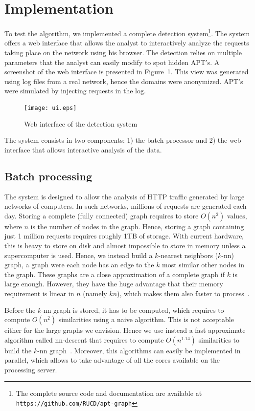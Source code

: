 \documentclass[conference]{IEEEtran}
\begin{document}
\section{Implementation}
\label{sec:implementation}

To test the algorithm, we implemented a complete detection system\footnote{The complete source code and documentation are available at \texttt{https://github.com/RUCD/apt-graph}}. The system offers a web interface that allows the analyst to interactively analyze the requests taking place on the network using his browser. The detection relies on multiple parameters that the analyst can easily modify to spot hidden APT's. A screenshot of the web interface is presented in Figure~\ref{fig:ui}. This view was generated using log files from a real network, hence the domains were anonymized. APT's were simulated by injecting requests in the log.

\begin{figure}
  \centering
  \texttt{[image: ui.eps]}
  \caption{Web interface of the detection system}
  \label{fig:ui}
\end{figure}

The system consists in two components: 1) the batch processor and 2) the web interface that allows interactive analysis of the data.

\subsection{Batch processing}

The system is designed to allow the analysis of HTTP traffic generated by large networks of computers. In such networks, millions of requests are generated each day. Storing a complete (fully connected) graph requires to store $O(n^2)$ values, where $n$ is the number of nodes in the graph. Hence, storing a graph containing just 1 million requests requires roughly 1TB of storage. With current hardware, this is heavy to store on disk and almost impossible to store in memory unless a supercomputer is used. Hence, we instead build a $k$-nearest neighbors ($k$-nn) graph, a graph were each node has an edge to the $k$ most similar other nodes in the graph. These graphs are a close approximation of a complete graph if $k$ is large enough. However, they have the huge advantage that their memory requirement is linear in $n$ (namely $kn$), which makes them also faster to process~\cite{LulliDDMR15}.

Before the $k$-nn graph is stored, it has to be computed, which requires to compute $O(n^2)$ similarities using a naive algorithm. This is not acceptable either for the large graphs we envision. Hence we use instead a fast approximate algorithm called nn-descent that requires to compute $O(n^{1.14})$ similarities to build the $k$-nn graph~\cite{Dong2011}. Moreover, this algorithms can easily be implemented in parallel, which allows to take advantage of all the cores available on the processing server.
\end{document}
